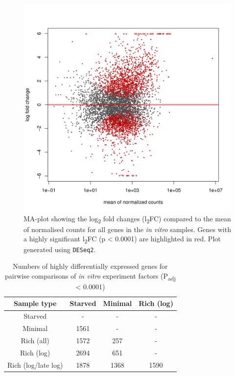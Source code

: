 \begin{figure}[H]
    \centering
    \includegraphics[scale=0.8]{psa/MA_plot_final_samples.png}
    \caption[MA-plot of gene expression changes for \textit{in vitro} experiments]{MA-plot showing the log\textsubscript{2} fold changes (l\textsubscript{2}FC) compared to the mean of normalised counts for all genes in the \textit{in vitro} samples. Genes with a highly significant l\textsubscript{2}FC (p < 0.0001) are highlighted in red. Plot generated using \texttt{DESeq2}.}
    \label{fig:in_vitro_MA_plot}

\end{figure}


\begin{table}[H]
\begin{minipage}{0.7\textwidth}
    \centering
    \begin{tabular}{cccc}\toprule
Sample type & Starved & Minimal & Rich (log) \\\midrule
Starved  & - & - & - \\
Minimal & 1561 & - & - \\
Rich (all) & 1572 & 257 & - \\
Rich (log) & 2694 & 651 & - \\
Rich (log/late log) & 1878 & 1368 & 1590 \\\bottomrule
    \end{tabular}
    \end{minipage}
    \begin{minipage}{0.29\textwidth}
    \caption[Numbers of significantly expressed genes for in vitro sample comparisons]{Numbers of highly differentially expressed genes for pairwise comparisons of \textit{in vitro} experiment factors (P\textsubscript{adj} < 0.0001)	}
    \label{tab:sig_DEGs}
        \end{minipage}
\end{table}


